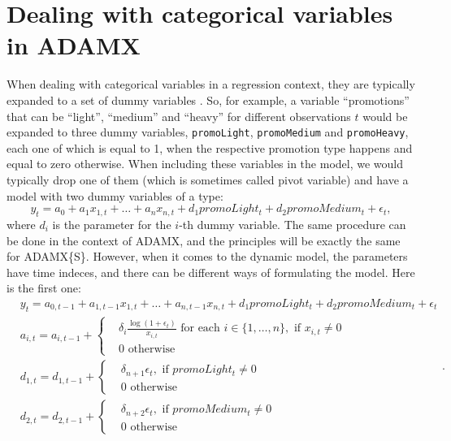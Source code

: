 \documentclass[
]{book}
\theoremstyle{definition}
\theoremstyle{definition}
\theoremstyle{definition}
\theoremstyle{definition}
\theoremstyle{remark}
\begin{document}
\hypertarget{ETSXDynamicCategories}{%
\section{Dealing with categorical variables in ADAMX}\label{ETSXDynamicCategories}}

When dealing with categorical variables in a regression context, they are typically expanded to a set of dummy variables \citep[see Chapter 10 of][]{SvetunkovSBA}. So, for example, a variable ``promotions'' that can be ``light'', ``medium'' and ``heavy'' for different observations \(t\) would be expanded to three dummy variables, \texttt{promoLight}, \texttt{promoMedium} and \texttt{promoHeavy}, each one of which is equal to 1, when the respective promotion type happens and equal to zero otherwise. When including these variables in the model, we would typically drop one of them (which is sometimes called pivot variable) and have a model with two dummy variables of a type:
\begin{equation}
  y_t = a_0 + a_1 x_{1,t} + \dots + a_n x_{n,t} + d_1 promoLight_t + d_2 promoMedium_t + \epsilon_t,
  \label{eq:RegressionWithDummies}
\end{equation}
where \(d_i\) is the parameter for the \(i\)-th dummy variable. The same procedure can be done in the context of ADAMX, and the principles will be exactly the same for ADAMX\{S\}. However, when it comes to the dynamic model, the parameters have time indeces, and there can be different ways of formulating the model. Here is the first one:
\begin{equation}
  \begin{aligned}
    & y_{t} = a_{0,t-1} + a_{1,t-1} x_{1,t} + \dots + a_{n,t-1} x_{n,t} + d_1 promoLight_t + d_2 promoMedium_t + \epsilon_t \\
    & a_{i,t} = a_{i,t-1} + \left \lbrace \begin{aligned}
                  &\delta_i \frac{\log(1+\epsilon_t)}{x_{i,t}} \text{ for each } i \in \{1, \dots, n\}, \text{ if } x_{i,t}\neq 0 \\
                  &0 \text{ otherwise }
            \end{aligned} \right. \\
    & d_{1,t} = d_{1,t-1} + \left \lbrace \begin{aligned}
                  &\delta_{n+1} \epsilon_t, \text{ if } promoLight_t\neq 0 \\
                  &0 \text{ otherwise }
            \end{aligned} \right. \\
    & d_{2,t} = d_{2,t-1} + \left \lbrace \begin{aligned}
                  &\delta_{n+2} \epsilon_t, \text{ if } promoMedium_t\neq 0 \\
                  &0 \text{ otherwise }
            \end{aligned} \right.
  \end{aligned} .
  \label{eq:ETSXDynamicDummies01}
\end{equation}
\end{document}
